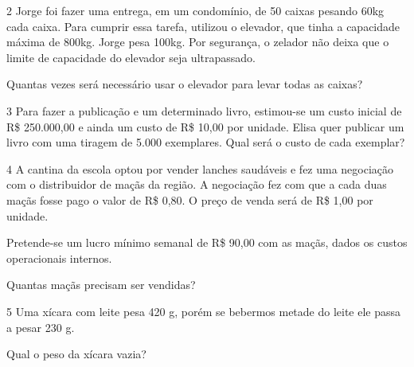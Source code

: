 {\begin{escolha}
{

\num{2} Jorge foi fazer uma entrega, em um condomínio, de 50 caixas
pesando 60kg cada caixa. Para cumprir essa tarefa, utilizou o elevador,
que tinha a capacidade máxima de 800kg. Jorge pesa 100kg. Por segurança,
o zelador não deixa que o limite de capacidade do elevador seja ultrapassado.

Quantas vezes será necessário usar o elevador para levar todas as
caixas?


\num{3} Para fazer a publicação e um determinado livro, estimou-se um
custo inicial de R\$ 250.000,00 e ainda um custo de R\$ 10,00 por
unidade. Elisa quer publicar um livro com uma tiragem de 5.000
exemplares. Qual será o custo de cada exemplar?



\num{4} A cantina da escola optou por vender lanches saudáveis e fez uma
negociação com o distribuidor de maçãs da região. A negociação fez com
que a cada duas maçãs fosse pago o valor de R\$ 0,80. O preço
de venda será de R\$ 1,00 por unidade.

Pretende-se um lucro mínimo semanal de R\$ 90,00 com as maçãs, dados os
custos operacionais internos.

Quantas maçãs precisam ser vendidas?



\num{5} Uma xícara com leite pesa 420 g, porém se bebermos metade do
leite ele passa a pesar 230 g.

Qual o peso da xícara vazia?

}
\end{escolha}}

